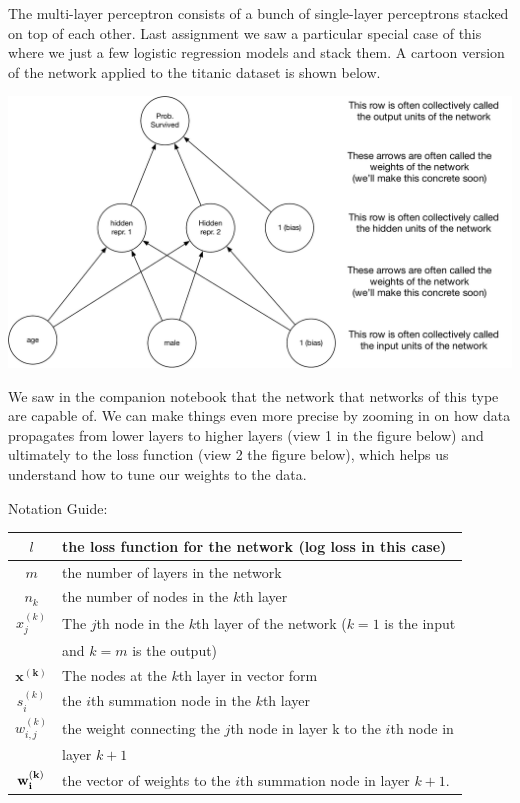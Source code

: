 \documentclass[assignment07_Solutions]{subfiles}
\begin{document}
\begin{recall}
The multi-layer perceptron consists of a bunch of single-layer perceptrons stacked on top of each other.  Last assignment we saw a particular special case of this where we just a few logistic regression models and stack them.  A cartoon version of the network applied to the titanic dataset is shown below.

\begin{center}
\includegraphics[width=0.7\linewidth]{figures/titanicmlpsimple}
\end{center}

We saw in the companion notebook that the network that networks of this type are capable of.  We can make things even more precise by zooming in on how data propagates from lower layers to higher layers (view 1 in the figure below) and ultimately to the loss function (view 2 the figure below), which helps us understand how to tune our weights to the data.

\vspace{1em}

Notation Guide:
\vspace{1em}

\begin{tabular}{| c | l |}
\hline
$l$ & the loss function for the network (log loss in this case) \\
\hline
$m$ & the number of layers in the network \\
\hline
$n_{k}$ & the number of nodes in the $k$th layer \\
\hline
$x_j^{(k)}$& The $j$th node in the $k$th layer of the network ($k = 1$ is the input \\
&and $k = m$ is the output) \\
\hline
$\mathbf{x^{(k)}}$ & The nodes at the $k$th layer in vector form \\
\hline
$s_{i}^{(k)}$ & the $i$th summation node in the $k$th layer \\
\hline
$w_{i,j}^{(k)}$ & the weight connecting the $j$th node in layer k to the $i$th node in\\
&  layer $k+1$ \\
\hline
$\mathbf{w_{i}^{(k)}}$ & the vector of weights to the $i$th summation node in layer $k+1$.\\
\hline
\end{tabular}


\end{recall}
\end{document}
